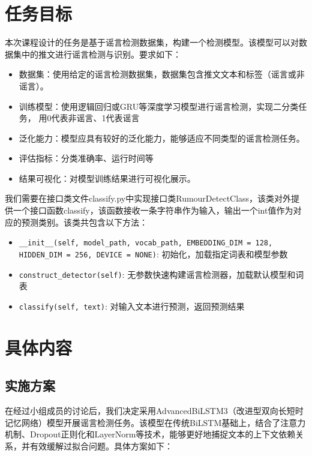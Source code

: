 \chapter{任务目标}

本次课程设计的任务是基于谣言检测数据集，构建一个检测模型。该模型可以对数据集中的推文进行谣言检测与识别。要求如下：
\begin{itemize}
    \item 数据集：使用给定的谣言检测数据集，数据集包含推文文本和标签（谣言或非谣言）。
    \item 训练模型：使用逻辑回归或GRU等深度学习模型进行谣言检测，实现二分类任务，
    用0代表非谣言、1代表谣言
    \item 泛化能力：模型应具有较好的泛化能力，能够适应不同类型的谣言检测任务。
    \item 评估指标：分类准确率、运行时间等
    \item 结果可视化：对模型训练结果进行可视化展示。
\end{itemize}

\vspace{1em}

我们需要在接口类文件classify.py中实现接口类RumourDetectClass，该类对外提供一个接口函数classify，该函数接收一条字符串作为输入，输出一个int值作为对应的预测类别。该类共包含以下方法：
\begin{itemize}
    \item \verb|__init__(self, model_path, vocab_path, EMBEDDING_DIM = 128, |\\
    \verb|HIDDEN_DIM = 256, DEVICE = NONE)|: 初始化，加载指定词表和模型参数
    \item \verb|construct_detector(self)|: 无参数快速构建谣言检测器，加载默认模型和词表
    \item \verb|classify(self, text)|: 对输入文本进行预测，返回预测结果
\end{itemize}

\chapter{具体内容}

\section{实施方案}

在经过小组成员的讨论后，我们决定采用AdvancedBiLSTM3（改进型双向长短时记忆网络）模型开展谣言检测任务。该模型在传统BiLSTM基础上，结合了注意力机制、Dropout正则化和LayerNorm等技术，能够更好地捕捉文本的上下文依赖关系，并有效缓解过拟合问题。具体方案如下：

